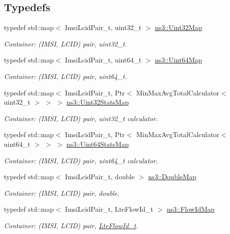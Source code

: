\subsection*{Typedefs}
\begin{DoxyCompactItemize}
\item 
typedef std\+::map$<$ Imsi\+Lcid\+Pair\+\_\+t, uint32\+\_\+t $>$ \hyperlink{namespacens3_abfd8d9eba8902c110c885a991a0529cd}{ns3\+::\+Uint32\+Map}
\begin{DoxyCompactList}\small\item\em Container\+: (I\+M\+SI, L\+C\+ID) pair, uint32\+\_\+t. \end{DoxyCompactList}\item 
typedef std\+::map$<$ Imsi\+Lcid\+Pair\+\_\+t, uint64\+\_\+t $>$ \hyperlink{namespacens3_a02246d7bb546e26a989e837a36d17797}{ns3\+::\+Uint64\+Map}
\begin{DoxyCompactList}\small\item\em Container\+: (I\+M\+SI, L\+C\+ID) pair, uint64\+\_\+t. \end{DoxyCompactList}\item 
typedef std\+::map$<$ Imsi\+Lcid\+Pair\+\_\+t, Ptr$<$ Min\+Max\+Avg\+Total\+Calculator$<$ uint32\+\_\+t $>$ $>$ $>$ \hyperlink{namespacens3_a024aec20f35b29a93b5bfcaacf8ce269}{ns3\+::\+Uint32\+Stats\+Map}
\begin{DoxyCompactList}\small\item\em Container\+: (I\+M\+SI, L\+C\+ID) pair, uint32\+\_\+t calculator. \end{DoxyCompactList}\item 
typedef std\+::map$<$ Imsi\+Lcid\+Pair\+\_\+t, Ptr$<$ Min\+Max\+Avg\+Total\+Calculator$<$ uint64\+\_\+t $>$ $>$ $>$ \hyperlink{namespacens3_a302499faee8d6f35953a73b52b34c421}{ns3\+::\+Uint64\+Stats\+Map}
\begin{DoxyCompactList}\small\item\em Container\+: (I\+M\+SI, L\+C\+ID) pair, uint64\+\_\+t calculator. \end{DoxyCompactList}\item 
typedef std\+::map$<$ Imsi\+Lcid\+Pair\+\_\+t, double $>$ \hyperlink{namespacens3_a5940420c315e238deaab45fe8fdc6112}{ns3\+::\+Double\+Map}
\begin{DoxyCompactList}\small\item\em Container\+: (I\+M\+SI, L\+C\+ID) pair, double. \end{DoxyCompactList}\item 
typedef std\+::map$<$ Imsi\+Lcid\+Pair\+\_\+t, Lte\+Flow\+Id\+\_\+t $>$ \hyperlink{namespacens3_aab54007b3e014c13ffebdb845302cd83}{ns3\+::\+Flow\+Id\+Map}
\begin{DoxyCompactList}\small\item\em Container\+: (I\+M\+SI, L\+C\+ID) pair, \hyperlink{structns3_1_1LteFlowId__t}{Lte\+Flow\+Id\+\_\+t}. \end{DoxyCompactList}\end{DoxyCompactItemize}
